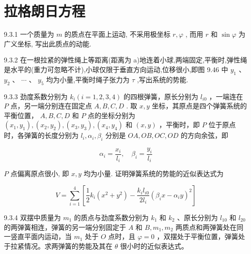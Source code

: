 \section{拉格朗日方程}

\begin{problem}{9.3.1}
一个质量为 $m$ 的质点在平面上运动, 不采用极坐标 $r, \varphi$ , 而用 $r$ 和 $\sin \varphi$ 为广义坐标, 写出此质点的动能.
\end{problem}
\clearpage


\begin{problem}{9.3.2}
在一根拉紧的弹性绳上等距离(距离为 a)地连着小球,两端固定,平衡时,弹性绳是水平的(重力可忽略不计),小球仅限于垂直方向运动,位移很小,即图 9.46 中 $y_{1}$ 、 $y_{2}$ 、 $\cdots$ 、 $y_{5}$ 均为小量,平衡时绳子张力为 $\tau$ ,写出系统的势能.
\begin{center}

\end{center}
\end{problem}
\clearpage


\begin{problem}{9.3.3}
劲度系数分别为 $k_{i}(i = 1,2,3,4)$ 的四根弹簧，原长分别为 $l_{i0}$ ，一端连在 $P$ 点，另一端分别连在固定点 $A,B,C,D$ . 取 $x,y$ 坐标，其原点是四个弹簧系统的平衡位置， $A,B,C,D$ 和 $P$ 点的坐标分别为 $(x_{1},y_{1}),(x_{2},y_{2}),(x_{3},y_{3}),(x_{4},y_{4})$ 和 $(x,y)$ ，平衡时，即 $P$ 位于原点时，各弹簧的长度分别为 $l_{i},\alpha_{i},\beta_{i}$ 分别是 $OA,OB,OC,OD$ 的方向余弦，即

\[
\alpha_ {i} = \frac {x _ {i}}{l _ {i}}, \quad \beta_ {i} = \frac {y _ {i}}{l _ {i}}
\]

$P$ 点偏离原点很小, 即 $x, y$ 均为小量. 证明弹簧系统的势能的近似表达式为

\[
V = \sum_ {i = 1} ^ {4} \left[ \frac {1}{2} k _ {i} (x ^ {2} + y ^ {2}) - \frac {k _ {i} l _ {i 0}}{2 l _ {i}} (\beta_ {i} x - \alpha_ {i} y) ^ {2} \right]
\]
\begin{center}

\end{center}
\end{problem}
\clearpage


\begin{problem}{9.3.4}
双摆中质量为 $m_{1}$ 的质点与劲度系数分别为 $k_{1}$ 和 $k_{2}$ 、原长分别为 $l_{10}$ 和 $l_{20}$ 的两弹簧相连，弹簧的另一端分别固定于 $A$ 和 $B, m_{1}, m_{2}$ 两质点和两弹簧处在同一竖直平面内运动，当 $m_{1}$ 处于 $O$ 点时，且 $\varphi = 0$ ，双摆处于平衡位置，弹簧处于拉紧情况。求两弹簧的势能及其在 $\theta$ 很小时的近似表达式。
\begin{center}

\end{center}
\end{problem}
\clearpage


